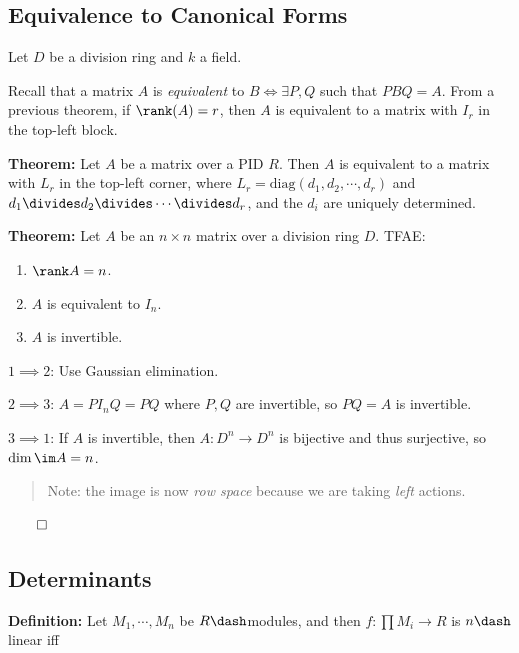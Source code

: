 \hypertarget{equivalence-to-canonical-forms}{%
\subsection{Equivalence to Canonical
Forms}\label{equivalence-to-canonical-forms}}

Let \(D\) be a division ring and \(k\) a field.

Recall that a matrix \(A\) is \emph{equivalent} to
\(B \iff \exists P, Q\) such that \(PBQ=A\). From a previous theorem, if
\(\rank(A) = r\), then \(A\) is equivalent to a matrix with \(I_r\) in
the top-left block.

\textbf{Theorem:} Let \(A\) be a matrix over a PID \(R\). Then \(A\) is
equivalent to a matrix with \(L_r\) in the top-left corner, where
\(L_r = \mathrm{diag}(d_1, d_2, \cdots, d_r)\) and
\(d_1 \divides d_2 \divides \cdots \divides d_r\), and the \(d_i\) are
uniquely determined.

\textbf{Theorem:} Let \(A\) be an \(n\times n\) matrix over a division
ring \(D\). TFAE:

\begin{enumerate}
\def\labelenumi{\arabic{enumi}.}
\item
  \(\rank A = n\).
\item
  \(A\) is equivalent to \(I_n\).
\item
  \(A\) is invertible.
\end{enumerate}

\(1\implies 2\): Use Gaussian elimination.

\(2\implies 3\): \(A = PI_n Q = PQ\) where \(P, Q\) are invertible, so
\(PQ = A\) is invertible.

\(3\implies 1\): If \(A\) is invertible, then \(A: D^n \to D^n\) is
bijective and thus surjective, so \(\dim \im A = n\).

\begin{quote}
Note: the image is now \emph{row space} because we are taking
\emph{left} actions.
\end{quote}

\(\qed\)

\hypertarget{determinants}{%
\subsection{Determinants}\label{determinants}}

\textbf{Definition:} Let \(M_1, \cdots, M_n\) be \(R\dash\)modules, and
then \(f: \prod M_i \to R\) is \(n\dash\)linear iff

